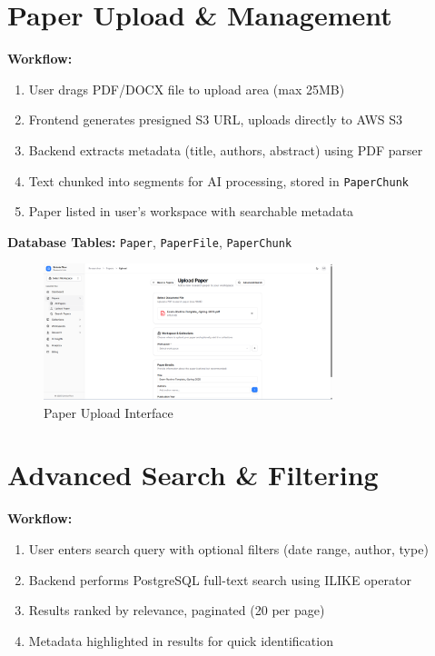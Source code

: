 \section{Paper Upload \& Management}

\textbf{Workflow:}
\begin{enumerate}[leftmargin=*,topsep=3pt,itemsep=2pt]
    \item User drags PDF/DOCX file to upload area (max 25MB)
    \item Frontend generates presigned S3 URL, uploads directly to AWS S3
    \item Backend extracts metadata (title, authors, abstract) using PDF parser
    \item Text chunked into segments for AI processing, stored in \texttt{PaperChunk}
    \item Paper listed in user's workspace with searchable metadata
\end{enumerate}

\textbf{Database Tables:} \texttt{Paper}, \texttt{PaperFile}, \texttt{PaperChunk}

\begin{figure}[H]
\centering
\includegraphics[width=0.75\textwidth]{images/screenshots/paper_upload.png}
\caption{Paper Upload Interface}
\label{fig:upload}
\end{figure}

\section{Advanced Search \& Filtering}

\textbf{Workflow:}
\begin{enumerate}[leftmargin=*,topsep=3pt,itemsep=2pt]
    \item User enters search query with optional filters (date range, author, type)
    \item Backend performs PostgreSQL full-text search using ILIKE operator
    \item Results ranked by relevance, paginated (20 per page)
    \item Metadata highlighted in results for quick identification
\end{enumerate}

